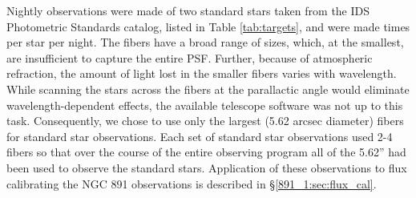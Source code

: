 Nightly observations were made of two standard stars taken from the
IDS Photometric Standards catalog, listed in Table \ref{tab:targets},
and were made  times per star per night. The \GP fibers have a
broad range of sizes, which, at the smallest, are insufficient to
capture the entire PSF. Further, because of atmospheric refraction,
the amount of light lost in the smaller fibers varies with wavelength.
While scanning the stars across the fibers at the parallactic
angle would eliminate wavelength-dependent effects, the available
telescope software was not up to this task. Consequently, we chose to
use only the largest (5.62 arcsec diameter) fibers for standard star
observations. Each set of standard star observations used 2-4 fibers
so that over the course of the entire observing program all of the
5.62'' had been used to observe the standard stars. Application of
these observations to flux calibrating the NGC 891 observations is
described in \S\ref{891_1:sec:flux_cal}.




